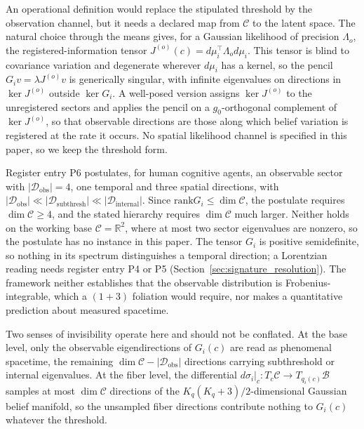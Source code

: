 \documentclass[11pt]{article}
\begin{document}
An operational definition would replace the stipulated threshold by the observation channel, but it needs a declared map from $\mathcal{C}$ to the latent space. The natural choice through the means gives, for a Gaussian likelihood of precision $\Lambda_o$, the registered-information tensor $J^{(o)}(c) = d\mu_i^\top \Lambda_o d\mu_i$. This tensor is blind to covariance variation and degenerate wherever $d\mu_i$ has a kernel, so the pencil $G_i v = \lambda J^{(o)} v$ is generically singular, with infinite eigenvalues on directions in $\ker J^{(o)}$ outside $\ker G_i$. A well-posed version assigns $\ker J^{(o)}$ to the unregistered sectors and applies the pencil on a $g_0$-orthogonal complement of $\ker J^{(o)}$, so that observable directions are those along which belief variation is registered at the rate it occurs. No spatial likelihood channel is specified in this paper, so we keep the threshold form.

Register entry P6 postulates, for human cognitive agents, an observable sector with $|\mathcal{D}_{\text{obs}}| = 4$, one temporal and three spatial directions, with $|\mathcal{D}_{\text{obs}}| \ll |\mathcal{D}_{\text{subthresh}}| \ll |\mathcal{D}_{\text{internal}}|$. Since $\mathrm{rank} G_i \le \dim\mathcal{C}$, the postulate requires $\dim\mathcal{C} \ge 4$, and the stated hierarchy requires $\dim\mathcal{C}$ much larger. Neither holds on the working base $\mathcal{C} = \mathbb{R}^2$, where at most two sector eigenvalues are nonzero, so the postulate has no instance in this paper. The tensor $G_i$ is positive semidefinite, so nothing in its spectrum distinguishes a temporal direction; a Lorentzian reading needs register entry P4 or P5 (Section~\ref{sec:signature_resolution}). The framework neither establishes that the observable distribution is Frobenius-integrable, which a $(1+3)$ foliation would require, nor makes a quantitative prediction about measured spacetime.

Two senses of invisibility operate here and should not be conflated. At the base level, only the observable eigendirections of $G_i(c)$ are read as phenomenal spacetime, the remaining $\dim\mathcal{C} - |\mathcal{D}_{\text{obs}}|$ directions carrying subthreshold or internal eigenvalues. At the fiber level, the differential $d\sigma_i|_c: T_c\mathcal{C} \to T_{q_i(c)}\mathcal{B}$ samples at most $\dim\mathcal{C}$ directions of the $K_q(K_q+3)/2$-dimensional Gaussian belief manifold, so the unsampled fiber directions contribute nothing to $G_i(c)$ whatever the threshold.
\end{document}
